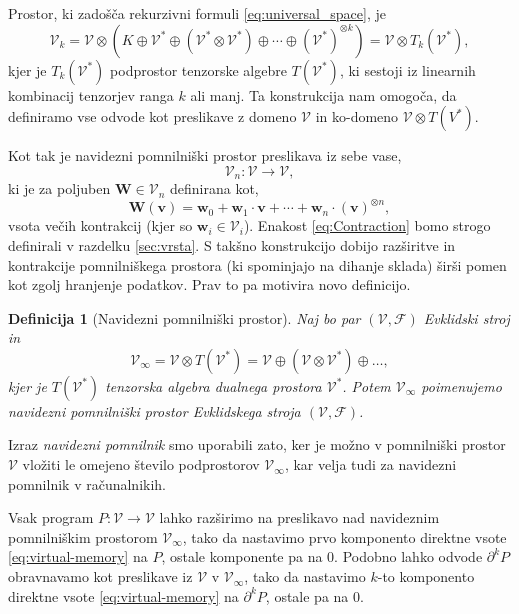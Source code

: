 \documentclass[a4paper, 12pt]{book}
\newcommand{\bfW}{\mathbf{W}}
\newcommand{\bfw}{\mathbf{w}}
\newcommand{\VV}{\mathcal{V}}
\newcommand{\vv}{\mathbf{v}}
\newcommand{\F}{\mathcal{F}}
\newcommand{\D}{\partial}
\newtheorem{definicija}{Definicija}[chapter]
\begin{document}
Prostor, ki zadošča rekurzivni formuli \eqref{eq:universal_space}, je
\begin{equation}
    \label{eq:k-th-virtual-space}
    \VV_k = \VV\otimes \left(K\oplus \VV^* \oplus (\VV^*\otimes \VV^*)\oplus\cdots\oplus
      (\VV^*)^{\otimes k}\right) = \VV\otimes T_k(\VV^*),
  \end{equation}
kjer je $T_k(\VV^*)$ podprostor tenzorske algebre $T(\VV^*)$, ki sestoji iz linearnih kombinacij tenzorjev ranga $k$ ali manj. Ta konstrukcija nam omogoča, da definiramo vse odvode kot preslikave z domeno $\VV$ in ko-domeno $\VV\otimes T(V^*)$.

\noindent Kot tak je navidezni pomnilniški prostor preslikava iz sebe vase,
\begin{equation}
\VV_n:\VV\to\VV,
\end{equation}
ki je za poljuben $\bfW\in\VV_n$ definirana kot, 
\begin{equation}
\bfW(\vv)=\bfw_0+\bfw_1\cdot\vv+\cdots+\bfw_n\cdot(\vv)^{\otimes n}\label{eq:Contraction},
\end{equation}
vsota večih kontrakcij (kjer so $\bfw_i\in\VV_i$). Enakost \eqref{eq:Contraction} bomo strogo definirali v razdelku \ref{sec:vrsta}. S takšno konstrukcijo dobijo razširitve in kontrakcije pomnilniškega prostora (ki spominjajo na dihanje sklada) širši pomen kot zgolj hranjenje podatkov. Prav to pa motivira novo definicijo.
\begin{definicija}[Navidezni pomnilniški prostor]
Naj bo par $(\VV,\F)$ Evklidski stroj in
\begin{equation}
\VV_\infty = \VV\otimes T(\VV^*) = \VV\oplus
(\VV\otimes\VV^*)\oplus\ldots,\label{eq:virtual-memory}
\end{equation}
kjer je $T(\VV^*)$ tenzorska algebra dualnega prostora $\VV^*$. Potem $\VV_\infty$ poimenujemo \emph{navidezni pomnilniški prostor} Evklidskega stroja $(\VV,\F)$.
\end{definicija}
Izraz \emph{navidezni pomnilnik} smo uporabili zato, ker je možno v pomnilniški prostor $\VV$ vložiti le omejeno število podprostorov $\VV_\infty$, kar velja tudi za navidezni pomnilnik v računalnikih.

Vsak program $P:\VV\to\VV$ lahko razširimo na preslikavo nad navideznim pomnilniškim prostorom $\VV_\infty$, tako da nastavimo prvo komponento direktne vsote \eqref{eq:virtual-memory} na $P$, ostale komponente pa na $0$. Podobno lahko odvode $\D^k P$ obravnavamo kot preslikave iz $\VV$ v $\VV_\infty$, tako da nastavimo $k$-to komponento direktne vsote \eqref{eq:virtual-memory} na $\D^k P$, ostale pa na $0$.
\end{document}
